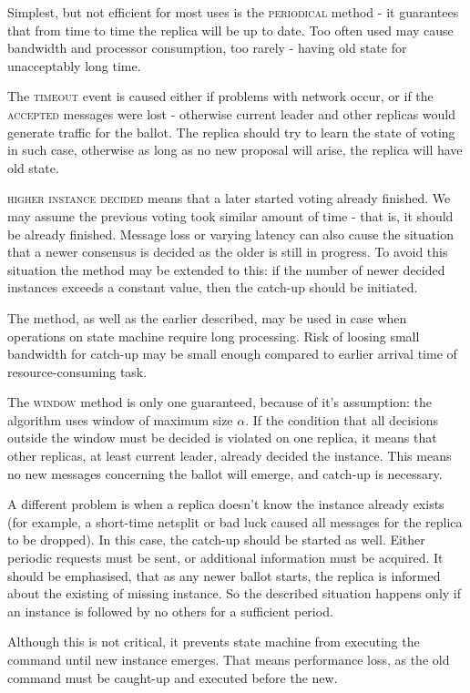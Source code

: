 Simplest, but not efficient for most uses is the \textsc{periodical} method - it guarantees that from time to time the replica will be up to date.
Too often used may cause bandwidth and processor consumption, too rarely - having old state for unacceptably long time.

The \textsc{timeout} event is caused either if problems with network occur, or if the \textsc{accepted} messages were lost - otherwise current leader and other replicas would generate traffic for the ballot. The replica should try to learn the state of voting in such case, otherwise as long as no new proposal will arise, the replica will have old state.

\textsc{higher instance decided} means that a later started voting already finished. We may assume the previous voting took similar amount of time - that is, it should be already finished. Message loss or varying latency can also cause the situation that a newer consensus is decided as the older is still in progress. To avoid this situation the method may be extended to this: if the number of newer decided instances exceeds a constant value, then the catch-up should be initiated.

The method, as well as the earlier described, may be used in case when operations on state machine require long processing. Risk of loosing small bandwidth for catch-up may be small enough compared to earlier arrival time of resource-consuming task.

The \textsc{window} method is only one guaranteed, because of it's assumption: the algorithm uses window of maximum size $\alpha$. If the condition that all decisions outside the window must be decided is violated on one replica, it means that other replicas, at least current leader, already decided the instance. This means no new messages concerning the ballot will emerge, and catch-up is necessary.


A different problem is when a replica doesn't know the instance already exists (for example, a short-time netsplit or bad luck caused all messages for the replica to be dropped). In this case, the catch-up should be started as well.
Either periodic requests must be sent, or additional information must be acquired. It should be emphasised, that as any newer ballot starts, the replica is informed about the existing of missing instance. So the described situation happens only if an instance is followed by no others for a sufficient period.

Although this is not critical, it prevents state machine from executing the command until new instance emerges. That means performance loss, as the old command must be caught-up and executed before the new.

